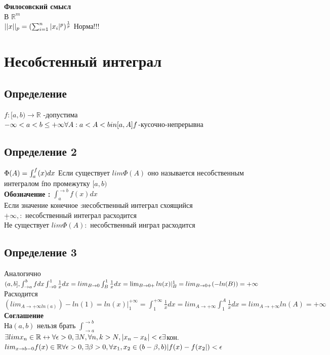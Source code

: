 \documentclass[12pt, a4paper]{article}
\begin{document}
	\textbf{Филосовский смысл}\\
	В $\mathbb{R}^m$\\
	$ ||x||_p = (\sum_{i=1}^n |x_i|^p)^{\frac{1}{p}}\\ $
	Норма!!! 
	
	\section{Несобстенный интеграл}
	\subsection{Определение}
	$ f: [a,b) \rightarrow\mathbb{R} $ -допустима \\
	$ -\infty < a < b \leq +\infty \\
	\forall A : a < A < b  in [a,A] f$-кусочно-непрерывна \\
	\subsection{Определение 2}
	$ \Phi(A)=\int_a^ f(x) dx \\$
	Если существует $ lim \Phi(A) $ оно называется несобственным интегралом fпо промежутку $[a,b)$      \\
	\textbf{Обозначение :} $\int_a^{\rightarrow b} f(x) dx $\\
	Если значение конечное :несобственный интеграл схоящийся \\
	$ \underline{+}\infty, : $ несобственный интеграл расходится \\
	Не существует $ lim \Phi(A)  :  $ несобственный инграл расходится \\
	\subsection{Определение 3}
	Аналогично $ (a,b] , \int_{\rightarrow a}^b f dx \\
	\int_{\rightarrow 0}^1 \frac{1}{x} dx  = lim_{B \rightarrow 0} \int_B^1 \frac{1}{x} dx = \lim_{B \rightarrow 0+} ln(x) |_B^1 = lim_{B\rightarrow 0+}(- ln (B)) = +\infty$ Расходится \\
	$ (lim_{A \rightarrow +\infty  ln(a)}) - ln(1) = ln(x)|_1^{+\infty} = \int_1^{+\infty} \frac{1}{x} dx = lim_{A\rightarrow +\infty} \int_1^A \frac{1}{x} dx = lim_{A\rightarrow  +\infty} ln(A)= +\infty$ \\
	\textbf{Соглашение}\\
	На$ (a,b) $ нельзя брать $ \int_{\rightarrow a}^{\rightarrow b} $
	$ \exists lim x_n \in \mathbb{R} \leftrightarrow \forall \epsilon >0, \exists N, \forall n, k>N, |x_n-x_k|<\epsilon \\
	\exists $кон. $ lim_{x \rightarrow b - 0} f(x) \in \mathbb{R} \\
	\forall\epsilon > 0, \exists \beta > 0, \forall x_1, x_2 \in (b - \beta, b) |f(x) -f(x_2|) < \epsilon \\ $
\end{document}
